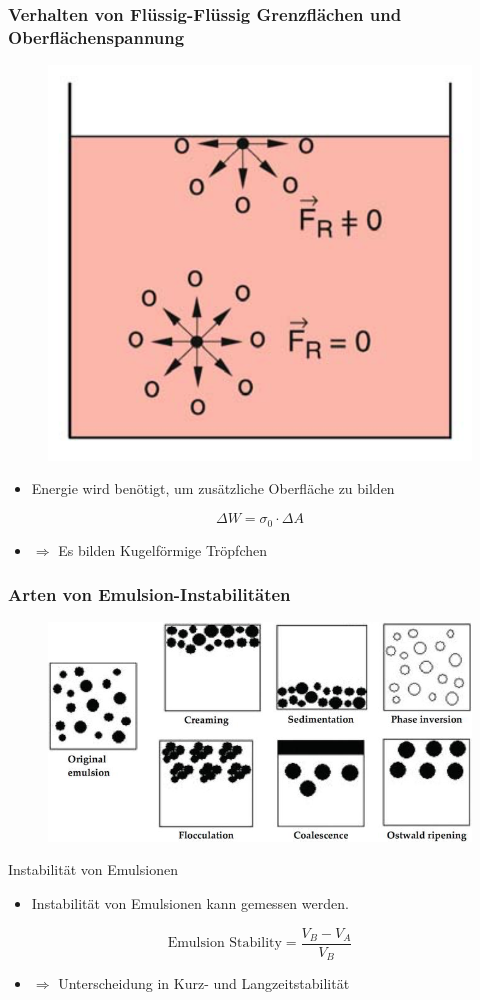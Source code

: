\documentclass{beamer} %
\begin{document}
\begin{frame}
\frametitle{Verhalten von Flüssig-Flüssig Grenzflächen und Oberflächenspannung}
\begin{figure}
	\centering
	\includegraphics[width=0.3\linewidth]{of.png}
\end{figure}

\begin{itemize}
	\item{Energie wird benötigt, um zusätzliche Oberfläche zu bilden}
\end{itemize}

\begin{equation}
\Delta W = \sigma_0\cdot \Delta A
\end{equation}
\pause
\begin{itemize}
	\item $\Rightarrow$ Es bilden Kugelförmige Tröpfchen
\end{itemize}
\end{frame}
\begin{frame}
	\frametitle{Arten von Emulsion-Instabilitäten}
\begin{figure}
	\centering
	\includegraphics[width=\linewidth]{F1.png}
\end{figure}
\end{frame}

\begin{frame}{Instabilität von Emulsionen}
	\begin{itemize}
		\item Instabilität von Emulsionen kann gemessen werden.
	\end{itemize}
\begin{equation}
\textrm{Emulsion Stability}=\frac{V_B-V_A}{V_B}
\end{equation}
\begin{itemize}
	\item $\Rightarrow$ Unterscheidung in Kurz- und Langzeitstabilität
\end{itemize}
\end{frame}
\end{document}
